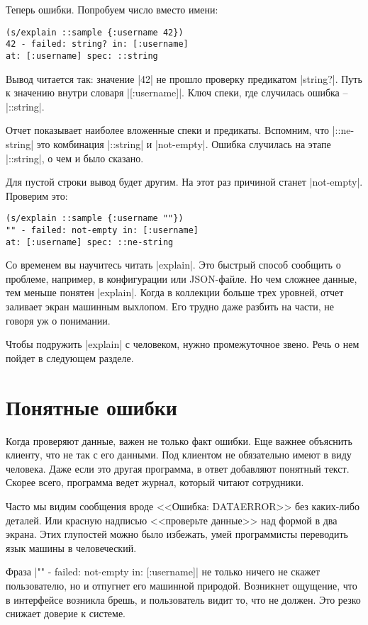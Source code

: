 Теперь ошибки. Попробуем число вместо имени:

\begin{verbatim}
(s/explain ::sample {:username 42})
42 - failed: string? in: [:username]
at: [:username] spec: ::string
\end{verbatim}

Вывод читается так: значение \spverb|42| не прошло проверку предикатом
\spverb|string?|. Путь к значению внутри словаря \spverb|[:username]|.
Ключ спеки, где случилась ошибка -- \spverb|::string|.

Отчет показывает наиболее вложенные спеки и предикаты. Вспомним, что
\spverb|::ne-string| это комбинация \spverb|::string| и
\spverb|not-empty|. Ошибка случилась на этапе \spverb|::string|, о чем и было
сказано.

Для пустой строки вывод будет другим. На этот раз причиной станет
\spverb|not-empty|. Проверим это:

\begin{verbatim}
(s/explain ::sample {:username ""})
"" - failed: not-empty in: [:username]
at: [:username] spec: ::ne-string
\end{verbatim}

Со временем вы научитесь читать \spverb|explain|. Это быстрый способ сообщить о
проблеме, например, в конфигурации или JSON-файле. Но чем сложнее данные, тем
меньше понятен \spverb|explain|. Когда в коллекции больше трех уровней, отчет
заливает экран машинным выхлопом. Его трудно даже разбить на части, не говоря уж
о понимании.

Чтобы подружить \spverb|explain| с человеком, нужно промежуточное звено. Речь о
нем пойдет в следующем разделе.

\section{Понятные ошибки}

Когда проверяют данные, важен не только факт ошибки. Еще важнее объяснить
клиенту, что не так с его данными. Под клиентом не обязательно имеют в виду
человека. Даже если это другая программа, в ответ добавляют понятный
текст. Скорее всего, программа ведет журнал, который читают сотрудники.

Часто мы видим сообщения вроде <<Ошибка: DATAERROR>> без каких-либо деталей. Или
красную надписью <<проверьте данные>> над формой в два экрана. Этих глупостей
можно было избежать, умей программисты переводить язык машины в человеческий.

Фраза \spverb|"" - failed: not-empty in: [:username]| не только ничего не скажет
пользователю, но и отпугнет его машинной природой. Возникнет ощущение, что в
интерфейсе возникла брешь, и пользователь видит то, что не должен. Это резко
снижает доверие к системе.

